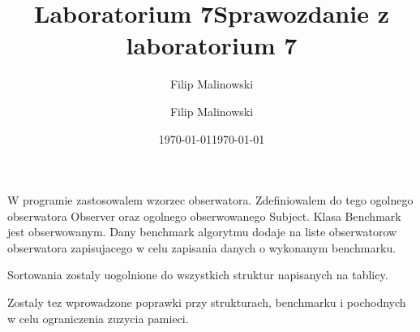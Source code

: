 \documentclass[a4paper,10pt]{scrartcl}
\title{Laboratorium 7}
\author{Filip Malinowski}
\date{\today}
\begin{document}
\title{Sprawozdanie z laboratorium 7}
\author{Filip Malinowski}
\date{\today}

\maketitle

W programie zastosowalem wzorzec obserwatora.
Zdefiniowalem do tego ogolnego obserwatora
Observer oraz ogolnego obserwowanego Subject.
Klasa Benchmark jest obserwowanym.
Dany benchmark algorytmu dodaje na liste
obserwatorow obserwatora zapisujacego
w celu zapisania danych o wykonanym benchmarku.

Sortowania zostaly uogolnione do wszystkich
struktur napisanych na tablicy.

Zostaly tez wprowadzone poprawki przy strukturach,
benchmarku i pochodnych w celu ograniczenia
zuzycia pamieci.
\end{document}
